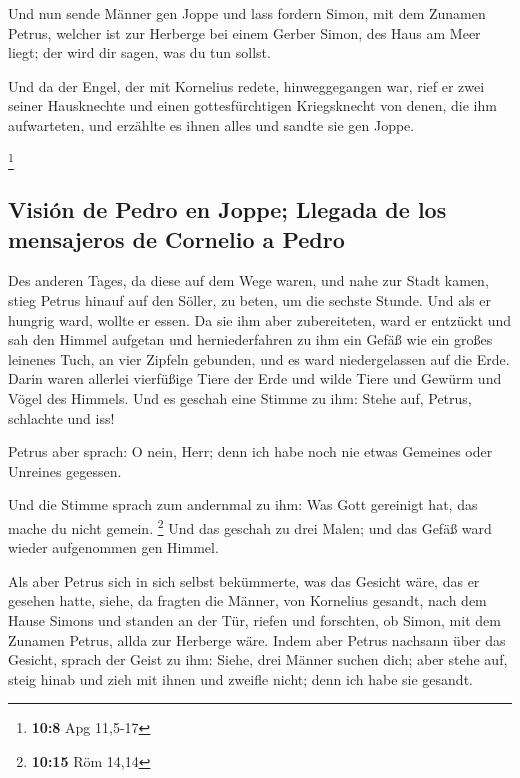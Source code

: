  Und nun sende Männer gen Joppe und lass fordern Simon,
mit dem Zunamen Petrus,  welcher ist zur Herberge bei
einem Gerber Simon, des Haus am Meer liegt; der wird dir sagen, was du
tun sollst.

 Und da der Engel, der mit Kornelius redete,
hinweggegangen war, rief er zwei seiner Hausknechte und einen
gottesfürchtigen Kriegsknecht von denen, die ihm aufwarteten,
 und erzählte es ihnen alles und sandte sie gen Joppe.

\footnote{\textbf{10:8} Apg 11,5-17}

\hypertarget{visiuxf3n-de-pedro-en-joppe-llegada-de-los-mensajeros-de-cornelio-a-pedro}{%
\subsection{Visión de Pedro en Joppe; Llegada de los mensajeros de
Cornelio a
Pedro}\label{visiuxf3n-de-pedro-en-joppe-llegada-de-los-mensajeros-de-cornelio-a-pedro}}

 Des anderen Tages, da diese auf dem Wege waren, und nahe
zur Stadt kamen, stieg Petrus hinauf auf den Söller, zu beten, um die
sechste Stunde.  Und als er hungrig ward, wollte er
essen. Da sie ihm aber zubereiteten, ward er entzückt 
und sah den Himmel aufgetan und herniederfahren zu ihm ein Gefäß wie ein
großes leinenes Tuch, an vier Zipfeln gebunden, und es ward
niedergelassen auf die Erde.  Darin waren allerlei
vierfüßige Tiere der Erde und wilde Tiere und Gewürm und Vögel des
Himmels.  Und es geschah eine Stimme zu ihm: Stehe auf,
Petrus, schlachte und iss!

 Petrus aber sprach: O nein, Herr; denn ich habe noch nie
etwas Gemeines oder Unreines gegessen.

 Und die Stimme sprach zum andernmal zu ihm: Was Gott
gereinigt hat, das mache du nicht gemein. \footnote{\textbf{10:15} Röm
  14,14}  Und das geschah zu drei Malen; und das Gefäß
ward wieder aufgenommen gen Himmel.

 Als aber Petrus sich in sich selbst bekümmerte, was das
Gesicht wäre, das er gesehen hatte, siehe, da fragten die Männer, von
Kornelius gesandt, nach dem Hause Simons und standen an der Tür,
 riefen und forschten, ob Simon, mit dem Zunamen Petrus,
allda zur Herberge wäre.  Indem aber Petrus nachsann über
das Gesicht, sprach der Geist zu ihm: Siehe, drei Männer suchen dich;
 aber stehe auf, steig hinab und zieh mit ihnen und
zweifle nicht; denn ich habe sie gesandt.

